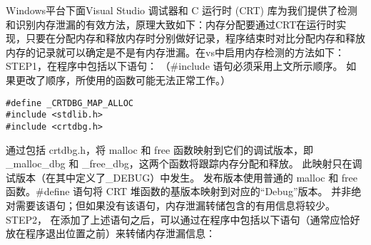 Windows平台下面Visual Studio 调试器和 C 运行时 (CRT) 库为我们提供了检测和识别内存泄漏的有效方法，原理大致如下：内存分配要通过CRT在运行时实现，只要在分配内存和释放内存时分别做好记录，程序结束时对比分配内存和释放内存的记录就可以确定是不是有内存泄漏。在vs中启用内存检测的方法如下：STEP1，在程序中包括以下语句： （\#include 语句必须采用上文所示顺序。 如果更改了顺序，所使用的函数可能无法正常工作。）
\begin{lstlisting}
#define _CRTDBG_MAP_ALLOC
#include <stdlib.h>
#include <crtdbg.h>
\end{lstlisting}
通过包括 crtdbg.h，将 malloc 和 free 函数映射到它们的调试版本，即 \_malloc\_dbg 和 \_free\_dbg，这两个函数将跟踪内存分配和释放。 此映射只在调试版本（在其中定义了\_DEBUG）中发生。 发布版本使用普通的 malloc 和 free 函数。\#define 语句将 CRT 堆函数的基版本映射到对应的“Debug”版本。 并非绝对需要该语句；但如果没有该语句，内存泄漏转储包含的有用信息将较少。STEP2， 在添加了上述语句之后，可以通过在程序中包括以下语句（通常应恰好放在程序退出位置之前）来转储内存泄漏信息：


